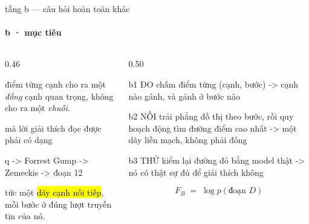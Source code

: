 \begin{frame}[fragile]{tầng b — câu hỏi hoàn toàn khác}
  \framesubtitle{b · mục tiêu}

  \begin{columns}[t]
  \begin{column}{0.46\textwidth}
    \begin{badb}[title={chấm điểm từng cạnh là KHÔNG đủ}]
      điểm từng cạnh cho ra một \emph{đống} cạnh quan trọng, không cho ra một
      \emph{chuỗi}.
      \vspace{0.3em}

      mà lời giải thích đọc được phải có dạng
      \begin{dia}
q -> Forrest Gump -> Zemeckis -> đoạn 12
      \end{dia}
      tức một \hl{dãy cạnh nối tiếp}, mỗi bước ở đúng lượt truyền tin của nó.
    \end{badb}
  \end{column}
  \begin{column}{0.50\textwidth}
    \begin{keyb}[title={ba bước — xương sống của cả phần này}]
      \begin{dia}
b1 ĐO    chấm điểm từng (cạnh, bước)
         -> cạnh nào gánh, và gánh ở bước nào

b2 NỐI   trải phẳng đồ thị theo bước, rồi
         quy hoạch động tìm đường điểm cao nhất
         -> một dãy liền mạch, không phải đống

b3 THỬ   kiểm lại đường đó bằng model thật
         -> nó có thật sự đủ để giải thích không
      \end{dia}
    \end{keyb}
    \begin{bx}[title={đại lượng đem ra chấm}]
      \[ F_B \;=\; \log p(\text{đoạn } D) \]
    \end{bx}
  \end{column}
  \end{columns}
\end{frame}
